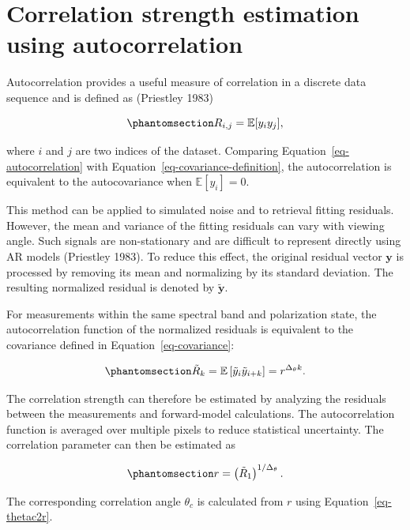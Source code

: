 \documentclass[
  11pt,
  letterpaper,
  DIV=11,
  numbers=noendperiod]{scrreprt}
\begin{document}
\section{Correlation strength estimation using
autocorrelation}\label{sec-ac}

Autocorrelation provides a useful measure of correlation in a discrete
data sequence and is defined as (Priestley 1983)

\begin{equation}\phantomsection\label{eq-autocorrelation}{
R_{i,j}
=
\mathbb{E}[y_i y_j],
}\end{equation}

where \(i\) and \(j\) are two indices of the dataset. Comparing
Equation~\ref{eq-autocorrelation} with
Equation~\ref{eq-covariance-definition}, the autocorrelation is
equivalent to the autocovariance when \(\mathbb{E}[y_i]=0\).

This method can be applied to simulated noise and to retrieval fitting
residuals. However, the mean and variance of the fitting residuals can
vary with viewing angle. Such signals are non-stationary and are
difficult to represent directly using AR models (Priestley 1983). To
reduce this effect, the original residual vector \(\mathbf{y}\) is
processed by removing its mean and normalizing by its standard
deviation. The resulting normalized residual is denoted by
\(\tilde{\mathbf{y}}\).

For measurements within the same spectral band and polarization state,
the autocorrelation function of the normalized residuals is equivalent
to the covariance defined in Equation~\ref{eq-covariance}:

\begin{equation}\phantomsection\label{eq-rk}{
\tilde{R}_k
=
\mathbb{E}
\left[
\tilde{y}_i
\tilde{y}_{i+k}
\right]
=
r^{\Delta_\theta k}.
}\end{equation}

The correlation strength can therefore be estimated by analyzing the
residuals between the measurements and forward-model calculations. The
autocorrelation function is averaged over multiple pixels to reduce
statistical uncertainty. The correlation parameter can then be estimated
as

\begin{equation}\phantomsection\label{eq-r-from-ac}{
r
=
\left(\tilde{R}_1\right)^{1/\Delta_\theta}.
}\end{equation}

The corresponding correlation angle \(\theta_c\) is calculated from
\(r\) using Equation~\ref{eq-thetac2r}.
\end{document}

